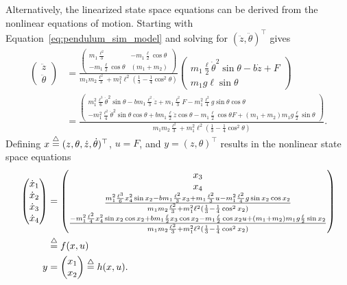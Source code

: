 Alternatively, the linearized state space equations can be derived from the nonlinear equations of motion.  Starting with Equation~\eqref{eq:pendulum_sim_model} and solving for $(\ddot{z}, \ddot{\theta})^\top$ gives
{\small
\begin{align*}
\begin{pmatrix} \ddot{z} \\ \ddot{\theta} \end{pmatrix}
  &= \frac{\begin{pmatrix} m_1\frac{\ell^2}{3} & -m_1\frac{\ell}{2}\cos\theta \\ -m_1\frac{\ell}{2}\cos\theta & (m_1+m_2)\end{pmatrix}}{m_1m_2\frac{\ell^2}{3} + m_1^2 \ell^2(\frac{1}{3} -\frac{1}{4}\cos^2\theta)}\begin{pmatrix} m_1\frac{\ell}{2}\dot{\theta}^2\sin\theta-b\dot{z}+F \\ m_1g\ell\sin\theta \end{pmatrix} \\
  &= \frac{\begin{pmatrix} m_1^2\frac{\ell^3}{6}\dot{\theta}^2\sin\theta - bm_1\frac{\ell^2}{3}\dot{z} + m_1\frac{\ell^2}{3}F - m_1^2\frac{\ell^2}{4}g\sin\theta\cos\theta \\ 
  -m_1^2\frac{\ell^2}{4}\dot{\theta}^2\sin\theta\cos\theta + bm_1\frac{\ell}{2}\dot{z}\cos\theta - m_1\frac{\ell}{2}\cos\theta F + (m_1+m_2)m_1g\frac{\ell}{2}\sin\theta\end{pmatrix}}{m_1m_2\frac{\ell^2}{3} + m_1^2 \ell^2(\frac{1}{3} -\frac{1}{4}\cos^2\theta)}.
\end{align*}
}
Defining $x\stackrel{\triangle}{=} (z, \theta, \dot{z}, \dot{\theta})^\top$, $u=F$, and $y=(z, \theta)^\top$ results in the nonlinear state space equations
{\normalsize
\begin{align*}
\begin{pmatrix}\dot{x}_1 \\ \dot{x}_2 \\ \dot{x}_3 \\ \dot{x}_4 \end{pmatrix} &= \begin{pmatrix} x_3 \\ x_4 \\ 
\frac{ m_1^2\frac{\ell^3}{6}x_4^2\sin x_2 - bm_1\frac{\ell^2}{3}x_3 + m_1\frac{\ell^2}{3}u - m_1^2\frac{\ell^2}{4}g\sin x_2 \cos x_2}{m_1m_2\frac{\ell^2}{3} + m_1^2 \ell^2(\frac{1}{3} -\frac{1}{4}\cos^2 x_2)} \\
\frac{-m_1^2\frac{\ell^2}{4}x_4^2\sin x_2 \cos x_2 + bm_1\frac{\ell}{2} x_3 \cos x_2 - m_1\frac{\ell}{2}\cos x_2 u + (m_1+m_2)m_1g\frac{\ell}{2}\sin x_2}{m_1m_2\frac{\ell^2}{3} + m_1^2 \ell^2(\frac{1}{3} -\frac{1}{4}\cos^2x_2)}
\end{pmatrix} \\ 
&\stackrel{\triangle}{=} f(x,u) \\
y &= \begin{pmatrix} x_1 \\ x_2 \end{pmatrix} \stackrel{\triangle}{=} h(x,u).
\end{align*}
}
